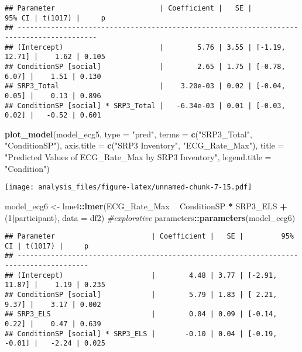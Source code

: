 \documentclass[
]{article}
\newenvironment{Shaded}{\begin{snugshade}}{\end{snugshade}}
\newcommand{\CommentTok}[1]{\textcolor[rgb]{0.56,0.35,0.01}{\textit{#1}}}
\newcommand{\DataTypeTok}[1]{\textcolor[rgb]{0.13,0.29,0.53}{#1}}
\newcommand{\DecValTok}[1]{\textcolor[rgb]{0.00,0.00,0.81}{#1}}
\newcommand{\KeywordTok}[1]{\textcolor[rgb]{0.13,0.29,0.53}{\textbf{#1}}}
\newcommand{\NormalTok}[1]{#1}
\newcommand{\OperatorTok}[1]{\textcolor[rgb]{0.81,0.36,0.00}{\textbf{#1}}}
\newcommand{\StringTok}[1]{\textcolor[rgb]{0.31,0.60,0.02}{#1}}
\begin{document}
\begin{verbatim}
## Parameter                         | Coefficient |   SE |         95% CI | t(1017) |     p
## -----------------------------------------------------------------------------------------
## (Intercept)                       |        5.76 | 3.55 | [-1.19, 12.71] |    1.62 | 0.105
## ConditionSP [social]              |        2.65 | 1.75 | [-0.78,  6.07] |    1.51 | 0.130
## SRP3_Total                        |    3.20e-03 | 0.02 | [-0.04,  0.05] |    0.13 | 0.896
## ConditionSP [social] * SRP3_Total |   -6.34e-03 | 0.01 | [-0.03,  0.02] |   -0.52 | 0.601
\end{verbatim}

\begin{Shaded}
\begin{Highlighting}[]
\KeywordTok{plot_model}\NormalTok{(model_ecg5, }\DataTypeTok{type =} \StringTok{"pred"}\NormalTok{, }\DataTypeTok{terms =} \KeywordTok{c}\NormalTok{(}\StringTok{"SRP3_Total"}\NormalTok{, }\StringTok{"ConditionSP"}\NormalTok{), }\DataTypeTok{axis.title =} \KeywordTok{c}\NormalTok{(}\StringTok{"SRP3 Inventory"}\NormalTok{, }\StringTok{"ECG_Rate_Max"}\NormalTok{), }\DataTypeTok{title =} \StringTok{"Predicted Values of ECG_Rate_Max by SRP3 Inventory"}\NormalTok{, }\DataTypeTok{legend.title =} \StringTok{"Condition"}\NormalTok{)}
\end{Highlighting}
\end{Shaded}

\texttt{[image: analysis\_files/figure-latex/unnamed-chunk-7-15.pdf]}

\begin{Shaded}
\begin{Highlighting}[]
\NormalTok{model_ecg6 <-}\StringTok{ }\NormalTok{lme4}\OperatorTok{::}\KeywordTok{lmer}\NormalTok{(ECG_Rate_Max }\OperatorTok{~}\StringTok{ }\NormalTok{ConditionSP }\OperatorTok{*}\StringTok{ }\NormalTok{SRP3_ELS }\OperatorTok{+}\StringTok{ }\NormalTok{(}\DecValTok{1}\OperatorTok{|}\NormalTok{participant), }\DataTypeTok{data =}\NormalTok{ df2)  }\CommentTok{#explorative}
\NormalTok{parameters}\OperatorTok{::}\KeywordTok{parameters}\NormalTok{(model_ecg6)}
\end{Highlighting}
\end{Shaded}

\begin{verbatim}
## Parameter                       | Coefficient |   SE |         95% CI | t(1017) |     p
## ---------------------------------------------------------------------------------------
## (Intercept)                     |        4.48 | 3.77 | [-2.91, 11.87] |    1.19 | 0.235
## ConditionSP [social]            |        5.79 | 1.83 | [ 2.21,  9.37] |    3.17 | 0.002
## SRP3_ELS                        |        0.04 | 0.09 | [-0.14,  0.22] |    0.47 | 0.639
## ConditionSP [social] * SRP3_ELS |       -0.10 | 0.04 | [-0.19, -0.01] |   -2.24 | 0.025
\end{verbatim}
\end{document}
